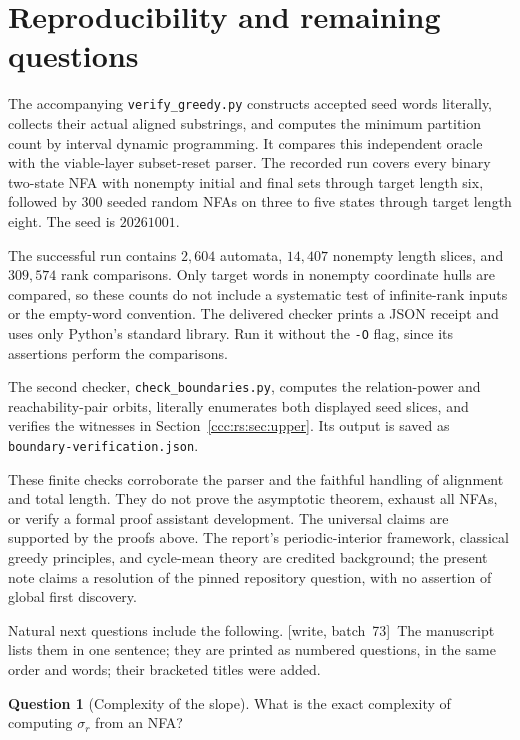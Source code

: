 \documentclass[11pt,letterpaper]{article}
\theoremstyle{definition}
\newtheorem{question}[theorem]{Question}
\theoremstyle{remark}
\newcommand{\wsevthree}{\textup{[write, batch~73]}}
\begin{document}
\section{Reproducibility and remaining questions}\label{ccc:rs:sec:verification}

The accompanying \texttt{verify\_greedy.py} constructs accepted seed words literally, collects their actual aligned substrings, and computes the minimum partition count by interval dynamic programming. It compares this independent oracle with the viable-layer subset-reset parser. The recorded run covers every binary two-state NFA with nonempty initial and final sets through target length six, followed by $300$ seeded random NFAs on three to five states through target length eight. The seed is $20261001$.

The successful run contains $2{,}604$ automata, $14{,}407$ nonempty length slices, and $309{,}574$ rank comparisons. Only target words in nonempty coordinate hulls are compared, so these counts do not include a systematic test of infinite-rank inputs or the empty-word convention. The delivered checker prints a JSON receipt and uses only Python's standard library. Run it without the \texttt{-O} flag, since its assertions perform the comparisons.

The second checker, \texttt{check\_boundaries.py}, computes the relation-power and reachability-pair orbits, literally enumerates both displayed seed slices, and verifies the witnesses in Section~\ref{ccc:rs:sec:upper}. Its output is saved as \texttt{boundary-verification.json}.

These finite checks corroborate the parser and the faithful handling of alignment and total length. They do not prove the asymptotic theorem, exhaust all NFAs, or verify a formal proof assistant development. The universal claims are supported by the proofs above. The report's periodic-interior framework, classical greedy principles, and cycle-mean theory are credited background; the present note claims a resolution of the pinned repository question, with no assertion of global first discovery.

Natural next questions include the following.
\wsevthree\ The manuscript lists them in one sentence; they are printed as
numbered questions, in the same order and words; their bracketed titles were
added.

\begin{question}[Complexity of the slope]\label{ccc:rs:q:complexity}
What is the exact complexity of computing $\sigma_r$ from an NFA?
\end{question}
\end{document}
